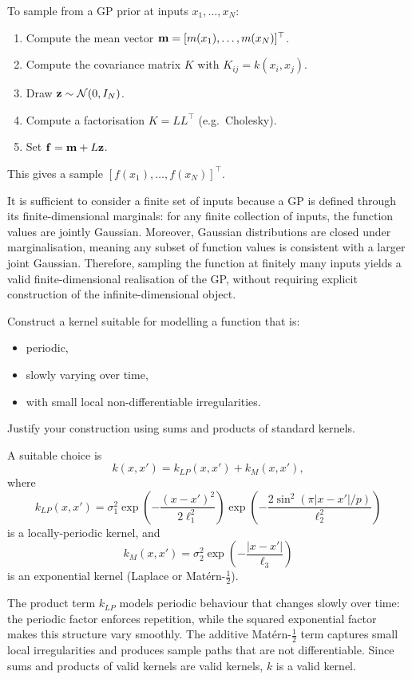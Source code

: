 \begin{solution}
To sample from a GP prior at inputs \(x_1,\ldots,x_N\):
\begin{enumerate}
    \item Compute the mean vector \({ \mathbf{m}} = [m(x_1),\ldots,m(x_N)]^\top\).
    \item Compute the covariance matrix \(K\) with \(K_{ij}=k(x_i,x_j)\).
    \item Draw \({ \mathbf{z}} \sim \mathcal N(0,I_N)\).
    \item Compute a factorisation \(K=LL^\top\) (e.g.\ Cholesky).
    \item Set \({ \mathbf{f}} = { \mathbf{m}} + L{ \mathbf{z}}\).
\end{enumerate}

This gives a sample \([f(x_1),\ldots,f(x_N)]^\top\).

It is sufficient to consider a finite set of inputs because a GP is defined through its finite-dimensional marginals: for any finite collection of inputs, the function values are jointly Gaussian. Moreover, Gaussian distributions are closed under marginalisation, meaning any subset of function values is consistent with a larger joint Gaussian. Therefore, sampling the function at finitely many inputs yields a valid finite-dimensional realisation of the GP, without requiring explicit construction of the infinite-dimensional object.
\end{solution}

\begin{exercise}
    Construct a kernel suitable for modelling a function that is:
    \begin{itemize}
        \item periodic,
        \item slowly varying over time,
        \item with small local non-differentiable  irregularities.
    \end{itemize}
    Justify your construction using sums and products of standard kernels.
\end{exercise}


\begin{solution}
A suitable choice is
\[
k(x,x') = k_{LP}(x,x') + k_{M}(x,x'),
\]
where
\[
k_{LP}(x,x')
=
\sigma_1^2
\exp\!\left(-\frac{(x-x')^2}{2\ell_1^2}\right)
\exp\!\left(-\frac{2\sin^2(\pi |x-x'|/p)}{\ell_2^2}\right)
\]
is a locally-periodic kernel, and
\[
k_M(x,x')
=
\sigma_2^2 \exp\!\left(-\frac{|x-x'|}{\ell_3}\right)
\]
is an exponential kernel (Laplace or Matérn-\(\tfrac12\)).

The product term \(k_{LP}\) models periodic behaviour that changes slowly over time: the periodic factor enforces repetition, while the squared exponential factor makes this structure vary smoothly. The additive Matérn-\(\tfrac12\) term captures small local irregularities and produces sample paths that are not differentiable. Since sums and products of valid kernels are valid kernels, \(k\) is a valid kernel.
\end{solution}
